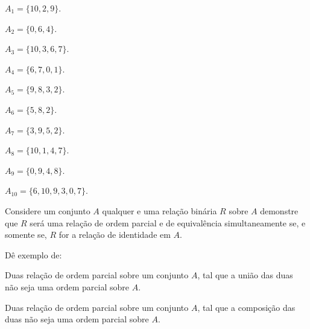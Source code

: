 \begin{exerList}
	\item $A_1 = \{10, 2, 9\}$.
	\item $A_2= \{0, 6, 4\}$.
	\item $A_3 = \{10, 3, 6, 7\}$.
	\item $A_4 = \{6, 7, 0, 1\}$.
	\item $A_5 = \{9, 8, 3, 2\}$.
	\item $A_6 = \{5, 8, 2\}$.
	\item $A_7 = \{3, 9, 5, 2\}$.
	\item $A_8 = \{10, 1, 4, 7\}$.
	\item $A_9 = \{0,  9, 4, 8\}$.
	\item $A_{10} = \{6, 10, 9, 3, 0, 7\}$.
\end{exerList}

\begin{problem}\label{prob:EquivalenciaOrdem19}
	Considere um conjunto $A$ qualquer e uma relação binária $R$ sobre $A$ demonstre que $R$ será uma relação de ordem parcial e de equivalência simultaneamente se, e somente se, $R$ for a relação de identidade em $A$.
\end{problem}

\begin{problem}\label{prob:EquivalenciaOrdemXX}
	Dê exemplo de:
\end{problem}

\begin{exerList}
	\item Duas relação de ordem parcial sobre um conjunto $A$, tal que a união das duas não seja uma ordem parcial sobre $A$.
	\item Duas relação de ordem parcial sobre um conjunto $A$, tal que a composição das duas não seja uma ordem parcial sobre $A$.
\end{exerList}
